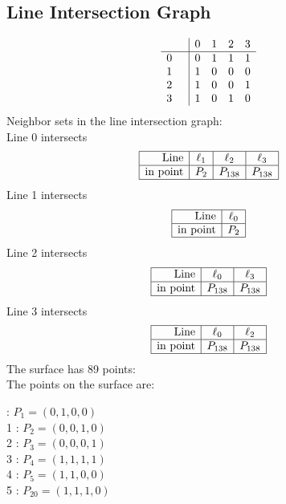 \documentclass{article}
\begin{document}
{\subsection*{Line Intersection Graph}
{\arraycolsep=1pt
$$
\begin{array}{rr|*{4}r}
 &  & 0 & 1 & 2 & 3\\
\hline
0 &  & 0 & 1 & 1 & 1\\
1 &  & 1 & 0 & 0 & 0\\
2 &  & 1 & 0 & 0 & 1\\
3 &  & 1 & 0 & 1 & 0\\
\end{array}
$$
}%
Neighbor sets in the line intersection graph:\\
Line 0 intersects 
$$
\begin{array}{|r*{3}{|c}|}
\hline
\mbox{Line}  & \ell_{1} & \ell_{2} & \ell_{3}\\
\hline
\mbox{in point}  & P_{2} & P_{138} & P_{138}\\
\hline
\end{array}
$$
Line 1 intersects 
$$
\begin{array}{|r*{1}{|c}|}
\hline
\mbox{Line}  & \ell_{0}\\
\hline
\mbox{in point}  & P_{2}\\
\hline
\end{array}
$$
Line 2 intersects 
$$
\begin{array}{|r*{2}{|c}|}
\hline
\mbox{Line}  & \ell_{0} & \ell_{3}\\
\hline
\mbox{in point}  & P_{138} & P_{138}\\
\hline
\end{array}
$$
Line 3 intersects 
$$
\begin{array}{|r*{2}{|c}|}
\hline
\mbox{Line}  & \ell_{0} & \ell_{2}\\
\hline
\mbox{in point}  & P_{138} & P_{138}\\
\hline
\end{array}
$$
The surface has 89 points:\\
The points on the surface are:\\
\begin{multicols}{3}
 : $P_{1}=( 0, 1, 0, 0 )$\\
1 : $P_{2}=( 0, 0, 1, 0 )$\\
2 : $P_{3}=( 0, 0, 0, 1 )$\\
3 : $P_{4}=( 1, 1, 1, 1 )$\\
4 : $P_{5}=( 1, 1, 0, 0 )$\\
5 : $P_{20}=( 1, 1, 1, 0 )$\\

\end{multicols}}
\end{document}
